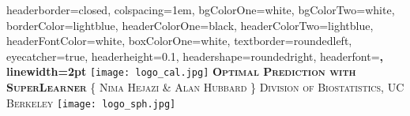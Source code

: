 \documentclass[landscape,a0paper,fontscale=0.285]{baposter} %
\begin{document}
\begin{poster}
{
headerborder=closed, %
colspacing=1em, %
bgColorOne=white, %
bgColorTwo=white, %
borderColor=lightblue, %
headerColorOne=black, %
headerColorTwo=lightblue, %
headerFontColor=white, %
boxColorOne=white, %
textborder=roundedleft, %
eyecatcher=true, %
headerheight=0.1\textheight, %
headershape=roundedright, %
headerfont=\Large\bf\textsc, %
linewidth=2pt %
}
%
{\texttt{[image: logo\_cal.jpg]}} %
{\bf\textsc{Optimal Prediction with SuperLearner}\vspace{0.5em}} %
{\textsc{\{ Nima Hejazi \& Alan Hubbard \} \hspace{12pt} Division of Biostatistics, UC Berkeley}}
{\texttt{[image: logo\_sph.jpg]}} %


\end{poster}
\end{document}
